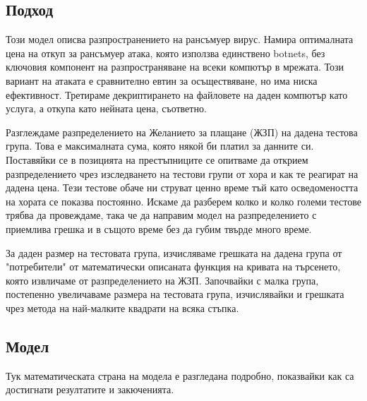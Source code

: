 \documentclass[11pt, a4paper]{article}
\theoremstyle{definition}
\begin{document}
		\subsection{Подход}
			Този модел описва разпространението на рансъмуер вирус. Намира оптималната цена на откуп за рансъмуер атака, която използва единствено botnets, без ключовия компонент на разпространяване на всеки компютър в мрежата. Този вариант на атаката е сравнително евтин за осъществяване, но има ниска ефективност. Третираме декриптирането на файловете на даден компютър като услуга, а откупа като нейната цена, съответно. \par
			Разглеждаме разпределението на Желанието за плащане (ЖЗП) на дадена тестова група. Това е максималната сума, която някой би платил за данните си. Поставяйки се в позицията на престъпниците се опитваме да открием разпределението чрез изследването на тестови групи от хора и как те реагират на дадена цена. Тези тестове обаче ни струват ценно време тъй като осведомеността на хората се показва постоянно. Искаме да разберем колко и колко големи тестове трябва да провеждаме, така че да направим модел на разпределението с приемлива грешка и в същото време без да губим твърде много време.\par
			За даден размер на тестовата група, изчисляваме грешката на дадена група от "потребители" от математически описаната функция на кривата на търсенето, която извличаме от разпределението на ЖЗП. Започвайки с малка група, постепенно увеличаваме размера на тестовата група, изчислявайки и грешката чрез метода на най-малките квадрати на всяка стъпка.
		\subsection{Модел}
			Тук математическата страна на модела е разгледана подробно, показвайки как са достигнати резултатите и закюченията.
\end{document}
